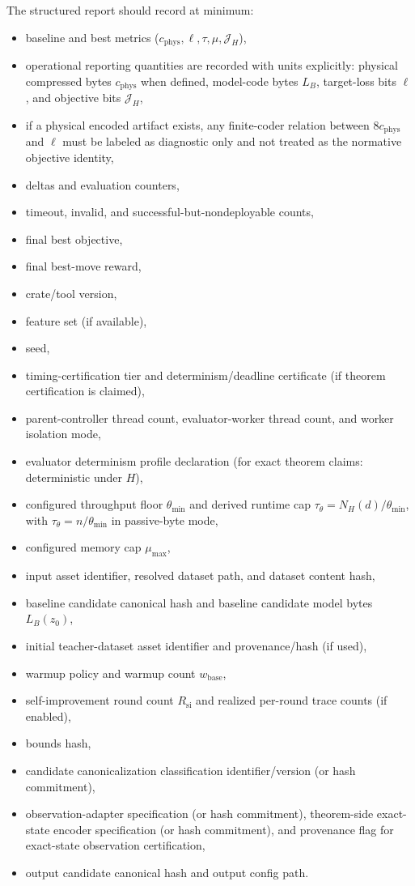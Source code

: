 \documentclass[11pt]{article}
\begin{document}
The structured report should record at minimum:
\begin{itemize}
    \item baseline and best metrics
    ($c_{\mathrm{phys}},\ell,\tau,\mu,\mathcal{J}_H$),
    \item operational reporting quantities are recorded with units explicitly:
    physical compressed bytes $c_{\mathrm{phys}}$ when defined,
    model-code bytes $L_B$, target-loss bits $\ell$, and objective bits
    $\mathcal{J}_H$,
    \item if a physical encoded artifact exists, any finite-coder relation
    between $8c_{\mathrm{phys}}$ and $\ell$ must be labeled as diagnostic only
    and not treated as the normative objective identity,
    \item deltas and evaluation counters,
    \item timeout, invalid, and successful-but-nondeployable counts,
    \item final best objective,
    \item final best-move reward,
    \item crate/tool version,
    \item feature set (if available),
    \item seed,
    \item timing-certification tier and determinism/deadline certificate (if
    theorem certification is claimed),
    \item parent-controller thread count, evaluator-worker thread count, and
    worker isolation mode,
    \item evaluator determinism profile declaration (for exact theorem claims:
    deterministic under $H$),
    \item configured throughput floor $\theta_{\min}$ and derived runtime cap
    $\tau_{\theta}=N_H(d)/\theta_{\min}$, with $\tau_{\theta}=n/\theta_{\min}$
    in passive-byte mode,
    \item configured memory cap $\mu_{\max}$,
    \item input asset identifier, resolved dataset path, and dataset content hash,
    \item baseline candidate canonical hash and baseline candidate model bytes
    $L_B(z_0)$,
    \item initial teacher-dataset asset identifier and provenance/hash (if used),
    \item warmup policy and warmup count $w_{\mathrm{base}}$,
    \item self-improvement round count $R_{\mathrm{si}}$ and realized per-round trace counts (if enabled),
    \item bounds hash,
    \item candidate canonicalization classification identifier/version (or hash commitment),
    \item observation-adapter specification (or hash commitment), theorem-side
    exact-state encoder specification (or hash commitment), and provenance flag
    for exact-state observation certification,
    \item output candidate canonical hash and output config path.
\end{itemize}
\end{document}
